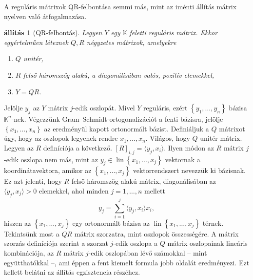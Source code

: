 \documentclass[a4paper, showtrims]{memoir}
\makeatletter
\renewenvironment{proof}[1][\proofname]
    {\par\pushQED{\qed}%
    \normalfont \topsep6\p@\@plus6\p@\relax
    \trivlist
    \item[\hskip\labelsep
        \itshape
    #1\@addpunct{:}]\ignorespaces}
    {\popQED\endtrivlist\@endpefalse}
\theoremstyle{plain}
\newtheorem{proposition}{állítás}[chapter]
\theoremstyle{remark}
\theoremstyle{definition}
\DeclareMathOperator{\lin}{lin}
\newcommand{\ip}[2]{\langle#1,#2\rangle}
\makeatother
\begin{document}
A reguláris mátrixok QR-felbontása semmi más, mint az iménti állítás mátrix nyelven való átfogalmazása.
\begin{proposition}[QR-felbontás]
    Legyen $Y$ egy $\mathbb{K}$ feletti reguláris mátrix.
    Ekkor egyértelműen léteznek  $Q,R$ négyzetes mátrixok, amelyekre
    \begin{enumerate}
        \item $Q$ unitér,
        \item $R$ felső háromszög alakú, a diagonálisában valós, pozitív elemekkel,
        \item $Y=QR$.\qedhere
    \end{enumerate}
\end{proposition}
\begin{proof}
    Jelölje $y_j$ az $Y$ mátrix $j$-edik oszlopát.
    Mivel $Y$ reguláris, ezért $\left\{ y_1,\dots,y_n \right\}$ bázisa $\mathbb{K}^n$-nek.
    Végezzünk Gram--Schmidt-ortogonalizációt a fenti bázisra, jelölje $\left\{ x_1,\dots,x_n \right\}$
    az eredményül kapott ortonormált bázist.
    Definiáljuk a $Q$ mátrixot úgy, hogy az oszlopok legyenek rendre $x_1,\dots,x_n$.
    Világos, hogy $Q$ unitér mátrix.
    Legyen az $R$ definíciója a következő.
    $[R]_{i,j}=\ip{y_j}{x_i}$.
    Ilyen módon az $R$ mátrix $j$-edik oszlopa nem más, mint az 
    $y_j\in\lin\left\{ x_1,\dots,x_j \right\}$ vektornak a koordinátavektora, amikor az $\left\{ x_1,\dots,x_j \right\}$
    vektorrendszert nevezzük ki bázisnak. Ez azt jelenti, hogy $R$ felső háromszög alakú mátrix,
    diagonálisában az $\ip{y_j}{x_j}>0$ elemekkel,
    ahol minden $j=1,\dots,n$ mellett
    \[
        y_j
        =
        \sum_{i=1}^j\ip{y_j}{x_i}x_i,
    \]
    hiszen az $\left\{ x_1,\dots,x_j \right\}$ egy ortonormált bázisa az $\lin\left\{ x_1,\dots,x_j \right\}$ térnek.
    Tekintsünk most a $QR$ mátrix szorzatra, mint oszlopok összességére.
    A mátrix szorzás definíciója szerint a szorzat $j$-edik oszlopa a $Q$ mátrix oszlopainak lineáris kombinációja,
    az $R$ mátrix $j$-edik oszlopában lévő számokkal -- mint együtthatókkal --,
    ami éppen a fent kiemelt formula jobb oldalát eredményezi.
    Ezt kellett belátni az állítás egzisztencia részéhez.


\end{proof}
\end{document}
